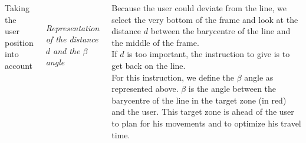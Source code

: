 \documentclass[17pt, a1paper, portrait]{tikzposter}
\begin{document}
\begin{columns}
{%

\begin{center} \LARGE {Taking the user position into account}
\end{center}

\begin{center}
\\
\centering
\caption{\emph{Representation of the distance \(d\) and the \(\beta\) angle}}
\end{center}

Because the user could deviate from the line, we select the very bottom of the frame and look at the distance \(d\) between the barycentre of the line and the middle of the frame.
\\
If \(d\) is too important, the instruction to give is to get back on the line.\\
For this instruction, we define the \(\beta\) angle as represented above.
\(\beta\) is the angle between the barycentre of the line in the target zone (in red) and the user.
This target zone is ahead of the user to plan for his movements and to optimize his travel time.






}


\end{columns}
\end{document}
